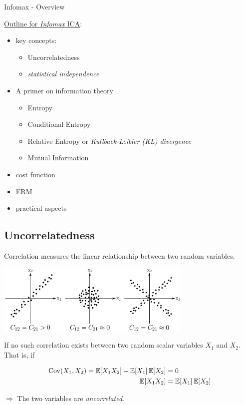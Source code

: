 \begin{frame}{Infomax - Overview}


\clearpage

\underline{Outline for \emph{Infomax} ICA}:
\begin{itemize}
	\item {}key concepts:
    \begin{itemize}
		\item Uncorrelatedness
		\item \emph{statistical independence}
    \end{itemize}
    \item A primer on information theory
    \begin{itemize}
        \item Entropy
        \item Conditional Entropy
        \item Relative Entropy or \emph{Kullback-Leibler (KL) divergence}
        \item Mutual Information
    \end{itemize}
    \item cost function
    \item ERM
    \item practical aspects
\end{itemize}

\end{frame}

\subsection{Uncorrelatedness}

\begin{frame}{\subsecname}

Correlation measures the linear relationship between two random variables.
\begin{center}
\includegraphics[width=0.7\textwidth]{img/section2_fig3.pdf}
\end{center}

If no such correlation exists between two random scalar variables $X_1$ and $X_2$. That is, if

\svspace{-3mm}

\begin{align}
\label{eq:uncorr}
\mathrm{Cov}(X_1, X_2) = \mathbb{E}  \lbrack X_1  X_2 \rbrack - \mathbb{E}  \lbrack X_1 \rbrack \, \mathbb{E} \lbrack X_2 \rbrack  &= 0\\
\mathbb{E}  \lbrack X_1  X_2 \rbrack &= \mathbb{E}  \lbrack X_1 \rbrack \, \mathbb{E} \lbrack X_2 \rbrack
\end{align}

$\Rightarrow$ The two variables are \emph{uncorrelated}.

\end{frame}

